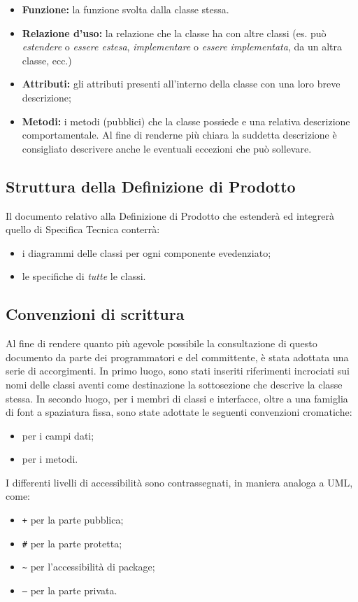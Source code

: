 {\begin{itemize} 
\item \textbf{Funzione:} la funzione svolta dalla classe stessa.
\item \textbf{Relazione d'uso:} la relazione che la classe ha con altre classi (es. può \textit{estendere} o \textit{essere estesa}, \textit{implementare} o \textit{essere implementata}, da un altra classe, ecc.)
\item \textbf{Attributi:} gli attributi presenti all'interno della classe con una loro breve descrizione;
\item \textbf{Metodi:} i metodi (pubblici) che la classe possiede e una relativa descrizione comportamentale. Al fine di renderne più chiara la suddetta descrizione è consigliato descrivere anche le eventuali eccezioni che può sollevare.
\end{itemize}
\subsection{Struttura della Definizione di Prodotto}
Il documento relativo alla Definizione di Prodotto che estenderà ed integrerà quello di Specifica Tecnica conterrà:
\begin{itemize}
\item i diagrammi delle classi per ogni componente evedenziato;
\item le specifiche di \textit{tutte} le classi.
\end{itemize}

\subsection{Convenzioni di scrittura}
Al fine di rendere quanto più agevole possibile la consultazione di questo documento da parte dei programmatori e del committente, è stata adottata una serie di accorgimenti. In primo luogo, sono stati inseriti riferimenti incrociati sui nomi delle classi aventi come destinazione la sottosezione che descrive la classe stessa.
In secondo luogo, per i membri di classi e interfacce, oltre a una famiglia di font a spaziatura fissa, sono state adottate le seguenti convenzioni cromatiche:
\begin{itemize}[noitemsep,nolistsep]
\item {} per i campi dati;
\item {} per i metodi.
\end{itemize}
I differenti livelli di accessibilità sono contrassegnati, in maniera analoga a UML, come:
\begin{itemize}
  \item \texttt{\ttfamily +} per la parte pubblica;
  \item \texttt{\ttfamily \#} per la parte protetta;
  \item \texttt{\ttfamily \textasciitilde} per  l'accessibilità di package;
  \item \texttt{\ttfamily --} per la parte privata.
\end{itemize}

}
